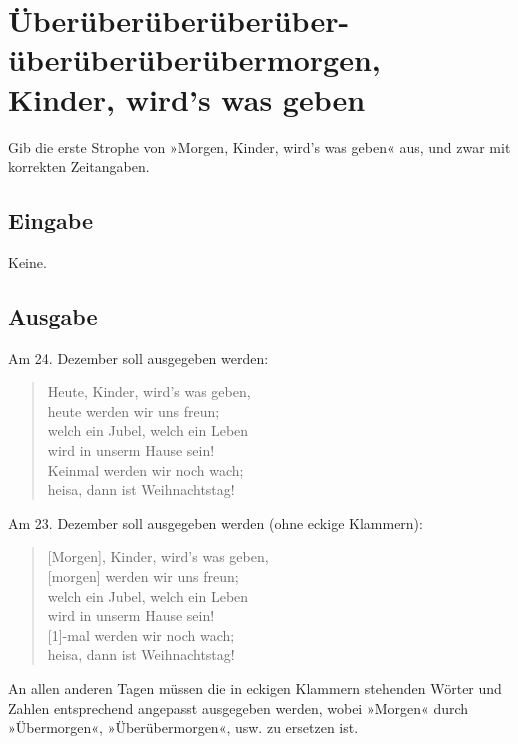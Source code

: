 \documentclass[a4paper, 14 pt]{extarticle}
\begin{document}
\section{Überüberüberüberüber-überüberüberübermorgen, \\ Kinder, wird’s was geben}

Gib die erste Strophe von »Morgen, Kinder, wird’s was geben« aus, und zwar mit korrekten Zeitangaben.

\subsection{Eingabe}

Keine.

\subsection{Ausgabe}

Am 24. Dezember soll ausgegeben werden:

\begin{quote}
Heute, Kinder, wird’s was geben,\\
heute werden wir uns freun;\\
welch ein Jubel, welch ein Leben\\
wird in unserm Hause sein!\\
Keinmal werden wir noch wach;\\
heisa, dann ist Weihnachtstag!
\end{quote}

Am 23. Dezember soll ausgegeben werden (ohne eckige Klammern):

\begin{quote}
[Morgen], Kinder, wird’s was geben,\\{}
[morgen] werden wir uns freun;\\
welch ein Jubel, welch ein Leben\\
wird in unserm Hause sein!\\{}
[1]-mal werden wir noch wach;\\
heisa, dann ist Weihnachtstag!
\end{quote}

An allen anderen Tagen müssen die in eckigen Klammern stehenden Wörter und Zahlen entsprechend angepasst ausgegeben werden, wobei »Morgen« durch »Übermorgen«, »Überübermorgen«, usw. zu ersetzen ist.
\end{document}
